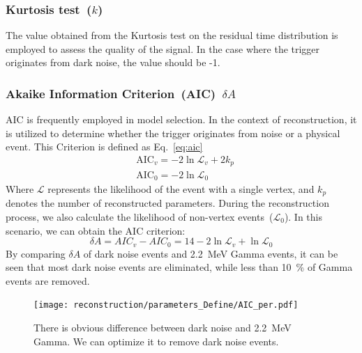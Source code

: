 \subsubsection{Kurtosis test~($k$)}
The value obtained from the Kurtosis test on the residual time distribution is employed to assess the quality of the signal. In the case where the trigger originates from dark noise, the value should be -1.

\subsubsection{Akaike Information Criterion~(AIC)~$\delta A$}
AIC is frequently employed in model selection. In the context of reconstruction, it is utilized to determine whether the trigger originates from noise or a physical event. This Criterion is defined as Eq.~\eqref{eq:aic}
\begin{equation}
	\begin{aligned}
		 & \text{AIC}_v = -2 \ln \mathcal{L}_v + 2k_p \\
		 & \text{AIC}_0 = -2 \ln \mathcal{L}_0
	\end{aligned}
	\label{eq:aic}
\end{equation}
Where $\mathcal{L}$ represents the likelihood of the event with a single vertex, and $k_p$ denotes the number of reconstructed parameters. During the reconstruction process, we also calculate the likelihood of non-vertex events~($\mathcal{L}_0$). In this scenario, we can obtain the AIC criterion:
\begin{equation}
	\delta A = AIC_v - AIC_0 = 14 - 2\ln \mathcal{L}_v + \ln \mathcal{L}_0
	\label{eq:daic}
\end{equation}
By comparing $\delta A$ of dark noise events and \SI{2.2}{MeV} Gamma events, it can be seen that most dark noise events are eliminated, while less than \SI{10}{\%} of Gamma events are removed.
\begin{figure}
	\centering
	\texttt{[image: reconstruction/parameters\_Define/AIC\_per.pdf]}
	\caption{There is obvious difference between dark noise and
		\SI{2.2}{MeV} Gamma. We can optimize it to remove dark noise events.}
\end{figure}

